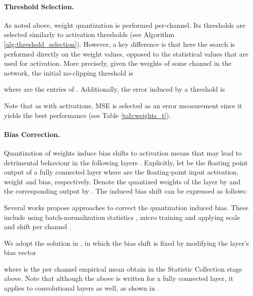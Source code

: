 \documentclass{article}
\begin{document}
\paragraph{Threshold Selection.} 
As noted above, weight quantization is performed per-channel. Its thresholds are selected similarly to activation thresholds (see Algorithm \ref{alg:threshold_selection}). However, a key difference is that here the search is performed directly on the weight values, opposed to the statistical values that are used for activation.
More precisely, given the weights  of some channel in the network, the initial no-clipping threshold is 

where  are the entries of . 
Additionally, the error induced by a threshold  is
 
Note that as with activations, MSE is selected as an error measurement since it yields the best performance (see Table \ref{tab:weights_t}). 














\paragraph{Bias Correction.} Quantization of weights induce bias shifts to activation means that may lead to detrimental behaviour in the following layers \cite{nagel2019data,finkelstein2019fighting}.  
Explicitly, let  be the floating point output of a fully connected layer where  are the floating-point input activation, weight and bias, respectively. 
Denote the quantized weights of the layer by 
and the corresponding output by
.
The induced bias shift  can be expressed as follows:

Several works propose approaches to correct the quantization induced bias. 
These include using batch-normalization statistics \cite{nagel2019data}, micro training  \cite{finkelstein2019fighting} and applying scale and shift per channel \cite{NEURIPS2019_c0a62e13}.

We adopt the solution in \cite{nagel2019data}, in which the bias shift is fixed by modifying the layer's bias vector

where  is the per channel empirical mean obtain in the Statistic Collection stage above. 
Note that although the above is written for a fully connected layer, it applies to convolutional layers as well, as shown in \cite{nagel2019data}.
\end{document}
